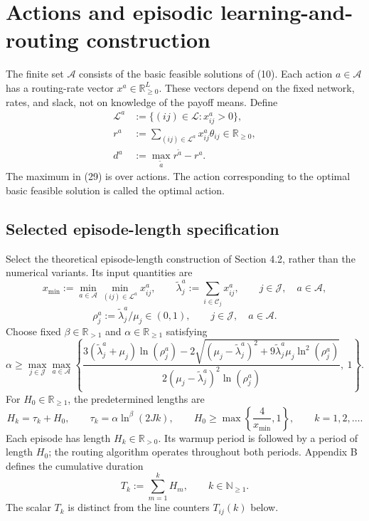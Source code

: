 \documentclass{article}
\begin{document}
\section*{Actions and episodic learning-and-routing construction}

The finite set $\mathcal A$ consists of the basic feasible solutions of (10). Each action $a\in\mathcal A$ has a routing-rate vector $x^a\in\mathbb R_{\geq0}^{L}$. These vectors depend on the fixed network, rates, and slack, not on knowledge of the payoff means. Define
\begin{align}
\mathcal L^a&:=\{(ij)\in\mathcal L:x^a_{ij}>0\},\tag{27}\\
r^a&:=\sum_{(ij)\in\mathcal L^a}x^a_{ij}\theta_{ij}\in\mathbb R_{\geq0},\tag{28}\\
d^a&:=\max_{\tilde a}r^{\tilde a}-r^a.\tag{29}
\end{align}
The maximum in (29) is over actions. The action corresponding to the optimal basic feasible solution is called the optimal action.

\subsection*{Selected episode-length specification}

Select the theoretical episode-length construction of Section 4.2, rather than the numerical variants. Its input quantities are
\[
x_{\min}:=\min_{a\in\mathcal A}\min_{(ij)\in\mathcal L^a}x^a_{ij},\qquad
\widetilde\lambda^a_j:=\sum_{i\in\mathcal C_j}x^a_{ij},
\qquad j\in\mathcal J,\quad a\in\mathcal A,
\]
\begin{equation}
\rho^a_j:=\widetilde\lambda^a_j/\mu_j\in(0,1),
\qquad j\in\mathcal J,\quad a\in\mathcal A.
\tag{34}
\end{equation}
Choose fixed $\beta\in\mathbb R_{>1}$ and $\alpha\in\mathbb R_{\geq1}$ satisfying
\begin{equation}
\alpha\geq\max_{j\in\mathcal J}\max_{a\in\mathcal A}
\left\{
\frac{3(\widetilde\lambda^a_j+\mu_j)\ln(\rho^a_j)
-2\sqrt{(\mu_j-\widetilde\lambda^a_j)^2+
9\widetilde\lambda^a_j\mu_j\ln^2(\rho^a_j)}}
{2(\mu_j-\widetilde\lambda^a_j)^2\ln(\rho^a_j)},\ 1
\right\}.
\tag{35}
\end{equation}
For $H_0\in\mathbb R_{\geq1}$, the predetermined lengths are
\begin{equation}
H_k=\tau_k+H_0,\qquad
\tau_k=\alpha\ln^\beta(2Jk),\qquad
H_0\geq\max\left\{\frac4{x_{\min}},1\right\},
\qquad k=1,2,\ldots.
\tag{36}
\end{equation}
Each episode has length $H_k\in\mathbb R_{>0}$. Its warmup period is followed by a period of length $H_0$; the routing algorithm operates throughout both periods. Appendix B defines the cumulative duration
\begin{equation}
T_k:=\sum_{m=1}^{k}H_m,\qquad k\in\mathbb N_{\geq1}.
\tag{75}
\end{equation}
The scalar $T_k$ is distinct from the line counters $T_{ij}(k)$ below.
\end{document}
